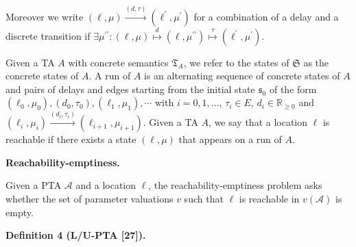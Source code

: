   
 
 
 
Moreover we write $(\mathrm{\ell},\mu)\stackrel{{\scriptstyle(d,\tau)}}{{\longrightarrow}}(\mathrm{\ell}^{\prime},\mu^{\prime})$ for a combination of a delay and a discrete transition if $\exists\mu^{\prime\prime}:(\mathrm{\ell},\mu)\stackrel{{\scriptstyle d}}{{\mapsto}}(\mathrm{\ell},\mu^{\prime\prime})\stackrel{{\scriptstyle\tau}}{{\mapsto}}(\mathrm{\ell}^{\prime},\mu^{\prime})$.\par
 
 
 
Given a TA ${A}$ with concrete semantics $\mathfrak{T}_{{A}}$, we refer to the states of $\mathfrak{S}$ as the concrete states of ${A}$. A run of ${A}$ is an alternating sequence of concrete states of ${A}$ and pairs of delays and edges starting from the initial state $\mathfrak{s}_{0}$ of the form $(\mathrm{\mathrm{\ell}}_{0},\mu_{0}),(d_{0},\tau_{0}),(\mathrm{\mathrm{\ell}}_{1},\mu_{1}),\cdots$ with $i=0,1,\dots$, $\tau_{i}\in E$, $d_{i}\in\mathbb{R}_{\geq 0}$ and $(\mathrm{\mathrm{\ell}}_{i},\mu_{i})\stackrel{{\scriptstyle(d_{i},\tau_{i})}}{{\longrightarrow}}(\mathrm{\mathrm{\ell}}_{i+1},\mu_{i+1})$. Given a TA ${A}$, we say that a location $\mathrm{\ell}$ is reachable if there exists a state $(\mathrm{\ell},\mu)$ that appears on a run of ${A}$.\par
 
 
 
\par\medskip\noindent\textbf{Reachability-emptiness.}\par
 
 
Given a PTA $\mathcal{A}$ and a location $\mathrm{\ell}$, the reachability-emptiness problem asks whether the set of parameter valuations $v$ such that $\mathrm{\ell}$ is reachable in $v(\mathcal{A})$ is empty.\par
 
 
 
\par\medskip\noindent\textbf{Definition 4 (L/U-PTA [27]).}\par
 
